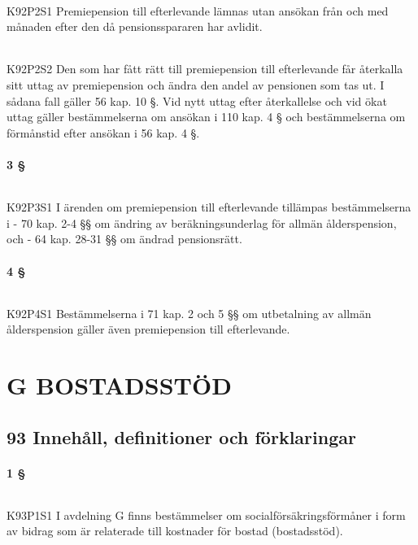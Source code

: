 \documentclass[a4paper,notitlepage,openany,10pt]{book}
\begin{document}
\paragraph*{}
{\tiny K92P2S1}
Premiepension till efterlevande lämnas utan ansökan från och med månaden efter den då pensionsspararen har avlidit.
\paragraph*{}
{\tiny K92P2S2}
Den som har fått rätt till premiepension till efterlevande får återkalla sitt uttag av premiepension och ändra den andel av pensionen som tas ut. I sådana fall gäller 56 kap. 10 §.
Vid nytt uttag efter återkallelse och vid ökat uttag gäller bestämmelserna om ansökan i 110 kap. 4 § och bestämmelserna om förmånstid efter ansökan i 56 kap. 4 §.
\subsection*{3 §}
\paragraph*{}
{\tiny K92P3S1}
I ärenden om premiepension till efterlevande tillämpas bestämmelserna i
\newline - 70 kap. 2-4 §§ om ändring av beräkningsunderlag för allmän ålderspension, och
\newline - 64 kap. 28-31 §§ om ändrad pensionsrätt.
\subsection*{4 §}
\paragraph*{}
{\tiny K92P4S1}
Bestämmelserna i 71 kap. 2 och 5 §§ om utbetalning av allmän ålderspension gäller även premiepension till efterlevande.
\part*{G BOSTADSSTÖD}
\chapter*{93 Innehåll, definitioner och förklaringar}
\subsection*{1 §}
\paragraph*{}
{\tiny K93P1S1}
I avdelning G finns bestämmelser om socialförsäkringsförmåner i form av bidrag som är relaterade till kostnader för bostad (bostadsstöd).
\end{document}
